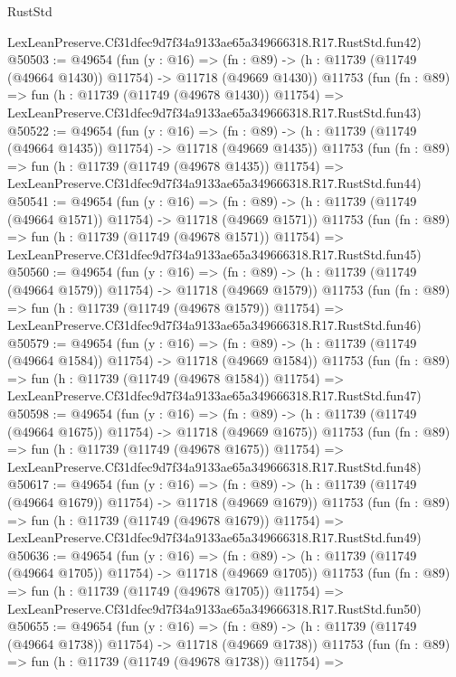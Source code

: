 \begin{lexlean}{RustStd}
\begin{coremodule}
    LexLeanPreserve.Cf31dfec9d7f34a9133ae65a349666318.R17.RustStd.fun42)
@50503 := @49654
    (fun (y : @16) =>
    (fn : @89) -> (h : @11739 (@11749 (@49664 @1430)) @11754) -> @11718 (@49669 @1430))
    @11753
    (fun (fn : @89) =>
    fun (h : @11739 (@11749 (@49678 @1430)) @11754) =>
    LexLeanPreserve.Cf31dfec9d7f34a9133ae65a349666318.R17.RustStd.fun43)
@50522 := @49654
    (fun (y : @16) =>
    (fn : @89) -> (h : @11739 (@11749 (@49664 @1435)) @11754) -> @11718 (@49669 @1435))
    @11753
    (fun (fn : @89) =>
    fun (h : @11739 (@11749 (@49678 @1435)) @11754) =>
    LexLeanPreserve.Cf31dfec9d7f34a9133ae65a349666318.R17.RustStd.fun44)
@50541 := @49654
    (fun (y : @16) =>
    (fn : @89) -> (h : @11739 (@11749 (@49664 @1571)) @11754) -> @11718 (@49669 @1571))
    @11753
    (fun (fn : @89) =>
    fun (h : @11739 (@11749 (@49678 @1571)) @11754) =>
    LexLeanPreserve.Cf31dfec9d7f34a9133ae65a349666318.R17.RustStd.fun45)
@50560 := @49654
    (fun (y : @16) =>
    (fn : @89) -> (h : @11739 (@11749 (@49664 @1579)) @11754) -> @11718 (@49669 @1579))
    @11753
    (fun (fn : @89) =>
    fun (h : @11739 (@11749 (@49678 @1579)) @11754) =>
    LexLeanPreserve.Cf31dfec9d7f34a9133ae65a349666318.R17.RustStd.fun46)
@50579 := @49654
    (fun (y : @16) =>
    (fn : @89) -> (h : @11739 (@11749 (@49664 @1584)) @11754) -> @11718 (@49669 @1584))
    @11753
    (fun (fn : @89) =>
    fun (h : @11739 (@11749 (@49678 @1584)) @11754) =>
    LexLeanPreserve.Cf31dfec9d7f34a9133ae65a349666318.R17.RustStd.fun47)
@50598 := @49654
    (fun (y : @16) =>
    (fn : @89) -> (h : @11739 (@11749 (@49664 @1675)) @11754) -> @11718 (@49669 @1675))
    @11753
    (fun (fn : @89) =>
    fun (h : @11739 (@11749 (@49678 @1675)) @11754) =>
    LexLeanPreserve.Cf31dfec9d7f34a9133ae65a349666318.R17.RustStd.fun48)
@50617 := @49654
    (fun (y : @16) =>
    (fn : @89) -> (h : @11739 (@11749 (@49664 @1679)) @11754) -> @11718 (@49669 @1679))
    @11753
    (fun (fn : @89) =>
    fun (h : @11739 (@11749 (@49678 @1679)) @11754) =>
    LexLeanPreserve.Cf31dfec9d7f34a9133ae65a349666318.R17.RustStd.fun49)
@50636 := @49654
    (fun (y : @16) =>
    (fn : @89) -> (h : @11739 (@11749 (@49664 @1705)) @11754) -> @11718 (@49669 @1705))
    @11753
    (fun (fn : @89) =>
    fun (h : @11739 (@11749 (@49678 @1705)) @11754) =>
    LexLeanPreserve.Cf31dfec9d7f34a9133ae65a349666318.R17.RustStd.fun50)
@50655 := @49654
    (fun (y : @16) =>
    (fn : @89) -> (h : @11739 (@11749 (@49664 @1738)) @11754) -> @11718 (@49669 @1738))
    @11753
    (fun (fn : @89) =>
    fun (h : @11739 (@11749 (@49678 @1738)) @11754) =>

\end{coremodule}
\end{lexlean}
